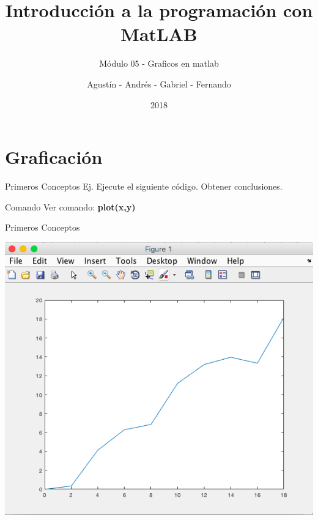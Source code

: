 \documentclass{bredelebeamer}
\title[Programación en MatLAB]{Introducción a la programación con MatLAB}
\subtitle{Módulo 05 - Graficos en matlab}
\author{Agustín - Andrés - Gabriel - Fernando\inst{1}}
\institute[UTN.BA]
{
  \inst{1}%
  Universidad Tecnológica Nacional\\
  Facultad Regional Buenos Aires
  }
\date{2018}
\begin{document}
\begin{frame}
  \titlepage 
\end{frame}




\section{Graficación}

\begin{frame}{Primeros Conceptos}
Ej. Ejecute el siguiente código. Obtener conclusiones.

\begin{exampleblock}{Comando}
Ver comando: \textbf{plot(x,y)}
\end{exampleblock}
\end{frame}

\begin{frame}{Primeros Conceptos}
\begin{center}
\includegraphics[scale=0.35]{images/pantalla14.png}
\end{center}
\end{frame}
\end{document}
